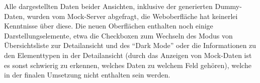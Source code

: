 Alle dargestellten Daten beider Ansichten, inklusive der generierten Dummy-Daten, wurden vom Mock-Server abgefragt, die Weboberfläche hat keinerlei Kenntnisse über diese. Die neuen Oberflächen enthalten noch einige Darstellungselemente, etwa die Checkboxen zum Wechseln des Modus von Übersichtsliste zur Detailansicht und des \enquote{Dark Mode} oder die Informationen zu den Elementtypen in der Detailansicht (durch das Anzeigen von Mock-Daten ist es sonst schwierig zu erkennen, welches Daten zu welchem Feld gehören), welche in der finalen Umsetzung nicht enthalten sein werden.
